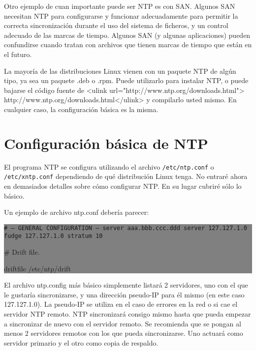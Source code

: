 Otro ejemplo de cuan importante puede ser NTP es con SAN. Algunos SAN
necesitan NTP para configurarse y funcionar adecuadamente para permitir
la correcta sincronización durante el uso del sistema de ficheros, y un
control adecuado de las marcas de tiempo. Algunos SAN (y algunas
aplicaciones) pueden confundirse cuando tratan con archivos que tienen marcas
de tiempo que están en el futuro.



La mayoría de las distribuciones Linux vienen con un paquete NTP de
algún tipo, ya sea un paquete .deb o .rpm. Puede utilizarlo para instalar
NTP, o puede bajarse el código fuente de
<ulink url="http://www.ntp.org/downloads.html">
http://www.ntp.org/downloads.html</ulink> y compilarlo usted mismo. En
cualquier caso, la configuración básica es la misma.





\section{
Configuración básica de NTP}


El programa NTP se configura utilizando el archivo \texttt{/etc/ntp.conf} o
\texttt{/etc/xntp.conf} dependiendo de qué distribución Linux tenga. No entraré
ahora en demasiados detalles sobre cómo configurar NTP. En su lugar cubriré
sólo lo básico.



Un ejemplo de archivo ntp.conf debería parecer:



\colorbox{grey}{\parbox[t]{0.95\linewidth}{ \vspace*{0.5cm} {\tt # --- GENERAL CONFIGURATION ---
server  aaa.bbb.ccc.ddd
server  127.127.1.0
fudge   127.127.1.0 stratum 10

# Drift file.

driftfile /etc/ntp/drift
 } \vspace*{0.5cm} } } 

	

	El archivo ntp.config más básico simplemente listará 2 servidores, uno
con el que le gustaría sincronizarse, y una dirección pseudo-IP para él 
mismo (en este caso 127.127.1.0). La pseudo-IP se utiliza en el caso de
errores en la red o si cae el servidor NTP remoto. NTP sincronizará
consigo mismo hasta que pueda empezar a sincronizar de nuevo con el 
servidor remoto. Se recomienda que se pongan al menos 2 servidores remotos
con los que pueda sincronizarse. Uno actuará como servidor primario y el 
otro como copia de respaldo.



